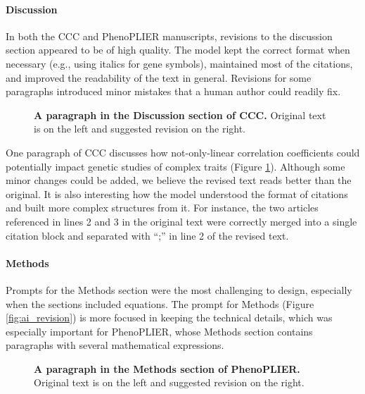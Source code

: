 \documentclass[
]{article}
\begin{document}
\hypertarget{discussion}{%
\paragraph{Discussion}\label{discussion}}

In both the CCC and PhenoPLIER manuscripts, revisions to the discussion section appeared to be of high quality.
The model kept the correct format when necessary (e.g., using italics for gene symbols), maintained most of the citations, and improved the readability of the text in general.
Revisions for some paragraphs introduced minor mistakes that a human author could readily fix.

\begin{figure}
\hypertarget{fig:discussion:ccc}{%
\centering

\caption{\textbf{A paragraph in the Discussion section of CCC.}
Original text is on the left and suggested revision on the right.}\label{fig:discussion:ccc}
}
\end{figure}

One paragraph of CCC discusses how not-only-linear correlation coefficients could potentially impact genetic studies of complex traits (Figure \ref{fig:discussion:ccc}).
Although some minor changes could be added, we believe the revised text reads better than the original.
It is also interesting how the model understood the format of citations and built more complex structures from it.
For instance, the two articles referenced in lines 2 and 3 in the original text were correctly merged into a single citation block and separated with ``;'' in line 2 of the revised text.

\hypertarget{methods}{%
\paragraph{Methods}\label{methods}}

Prompts for the Methods section were the most challenging to design, especially when the sections included equations.
The prompt for Methods (Figure \ref{fig:ai_revision}) is more focused in keeping the technical details, which was especially important for PhenoPLIER, whose Methods section contains paragraphs with several mathematical expressions.

\begin{figure}
\hypertarget{fig:methods:phenoplier}{%
\centering

\caption{\textbf{A paragraph in the Methods section of PhenoPLIER.}
Original text is on the left and suggested revision on the right.}\label{fig:methods:phenoplier}
}
\end{figure}
\end{document}
